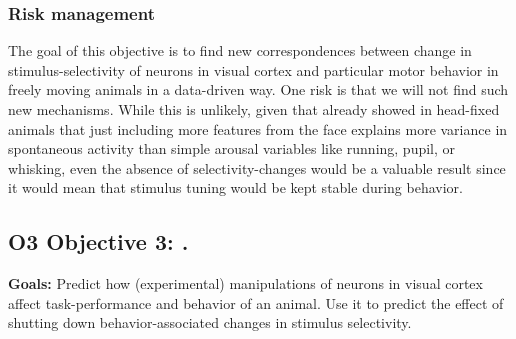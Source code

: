 \documentclass[B2,COG]{ercgrant}
\begin{document}
\subsubsection{Risk management} 
The goal of this objective is to find new correspondences between change in stimulus-selectivity of neurons in visual cortex and particular motor behavior in freely moving animals in a data-driven way.
One risk is that we will not find such new mechanisms.
While this is unlikely, given that \textcite{Stringer2019-lt} already showed in head-fixed animals that just including more features from the face explains more variance in spontaneous activity than simple arousal variables like running, pupil, or whisking, even the absence of selectivity-changes would be a valuable result since it would mean that stimulus tuning would be kept stable during behavior. 




\subsection{\colorbox{obj3}{\color{white} O3} Objective 3: \othreetitle .}

\textbf{Goals:} Predict how (experimental) manipulations of neurons in visual cortex affect task-performance and behavior of an animal. Use it to predict the effect of shutting down behavior-associated changes in stimulus selectivity. 
\end{document}
